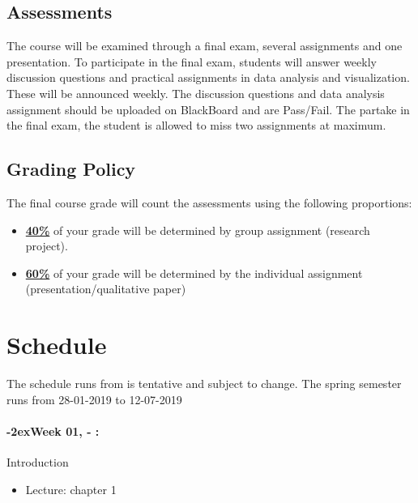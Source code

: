 \documentclass[11pt]{article}
\newcommand{\week}[1]{%
  \paragraph*{\kern-2ex\quad #1, \syldate{\today} - \AdvanceDate[4]\syldate{\today}:}%
  \ifdim\wd1=\wd\MONDAY
    \AdvanceDate[7]
  \else
    \AdvanceDate[7]
  \fi%
}
\begin{document}
\subsection*{Assessments}

The course will be examined through a final exam, several assignments and one presentation. To participate in the final exam, students will answer weekly discussion questions and practical assignments in data analysis and visualization. These will be announced weekly. The discussion questions and data analysis assignment should be uploaded on BlackBoard and are Pass/Fail. The partake in the final exam, the student is allowed to miss two assignments at maximum.



\subsection*{Grading Policy}
The final course grade will count the assessments using the following proportions:
\begin{itemize}
	\item \underline{\textbf{40\%}} of your grade will be determined by group assignment (research project).
	\item \underline{\textbf{60\%}} of your grade will be determined by the individual assignment (presentation/qualitative paper)
	


\end{itemize}



\newpage
\section*{Schedule}

The schedule runs from is tentative and subject to change. The spring semester  runs from 28-01-2019 to 12-07-2019

\SetDate[28/01/2019]
\week{Week 01} Introduction
\begin{itemize}
\item Lecture: chapter 1
\end{itemize}

\
\end{document}
